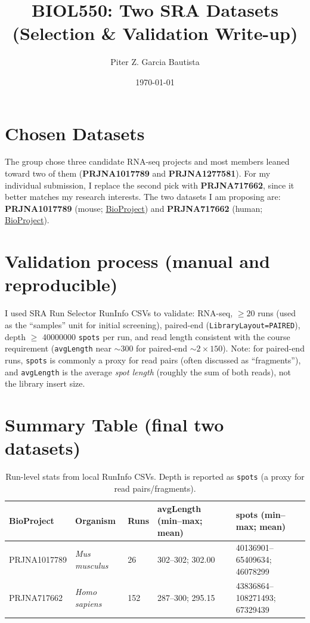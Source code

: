 \documentclass[10pt]{article}
\title{BIOL550: Two SRA Datasets (Selection \& Validation Write-up)}
\author{Piter Z. Garcia Bautista}
\date{\today}
\begin{document}
\maketitle

\section{Chosen Datasets}

The group chose three candidate RNA-seq projects and most members leaned toward two of them (\textbf{PRJNA1017789} and \textbf{PRJNA1277581}). For my individual submission, I replace the second pick with \textbf{PRJNA717662}, since it better matches my research interests. The two datasets I am proposing are: \textbf{PRJNA1017789} (mouse; \href{https://www.ncbi.nlm.nih.gov/bioproject/PRJNA1017789}{BioProject}) and \textbf{PRJNA717662} (human; \href{https://www.ncbi.nlm.nih.gov/bioproject/PRJNA717662}{BioProject}).

\section{Validation process (manual and reproducible)}

I used SRA Run Selector RunInfo CSVs to validate: RNA-seq, \(\ge 20\) runs (used as the ``samples'' unit for initial screening), paired-end (\texttt{LibraryLayout=PAIRED}), depth \(\ge\) \num{40000000} \texttt{spots} per run, and read length consistent with the course requirement (\texttt{avgLength} near \(\sim 300\) for paired-end \(\sim 2\times 150\)). Note: for paired-end runs, \texttt{spots} is commonly a proxy for read pairs (often discussed as ``fragments''), and \texttt{avgLength} is the average \emph{spot length} (roughly the sum of both reads), not the library insert size.

\section{Summary Table (final two datasets)}

\begin{table}[h]
\centering
\scriptsize
\setlength{\tabcolsep}{3.5pt}
\begin{tabular}{p{1.75cm} p{1.85cm} p{0.75cm} p{2.65cm} p{4.7cm}}
\toprule
\textbf{BioProject} & \textbf{Organism} & \textbf{Runs} & \textbf{avgLength (min--max; mean)} & \textbf{spots (min--max; mean)} \\
\midrule
PRJNA1017789 & \emph{Mus musculus} & 26 & 302--302; 302.00 & \num{40136901}--\num{65409634}; \num{46078299} \\
\addlinespace
PRJNA717662 & \emph{Homo sapiens} & 152 & 287--300; 295.15 & \num{43836864}--\num{108271493}; \num{67329439} \\
\bottomrule
\end{tabular}
\caption{Run-level stats from local RunInfo CSVs. Depth is reported as \texttt{spots} (a proxy for read pairs/fragments).}
\end{table}
\end{document}
